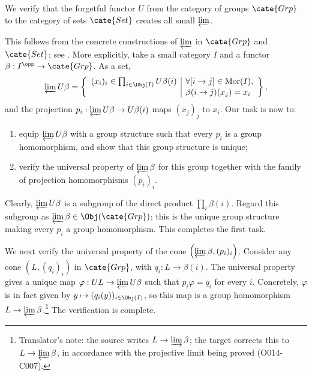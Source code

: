 \begin{example}\label{eg:Grp-Set-create}
	We verify that the forgetful functor $U$ from the category of groups
	$\cate{Grp}$ to the category of sets $\cate{Set}$ creates all small
	$\varprojlim$.

	This follows from the concrete constructions of $\varprojlim$ in
	$\cate{Grp}$ and $\cate{Set}$; see
	\cite[Examples 2.7.5 and 2.8.7]{Li1}. More explicitly, take a small category
	$I$ and a functor $\beta: I^{\opp} \to \cate{Grp}$. As a set,
	\[ \varprojlim U\beta = \left\{\begin{array}{r|l}
		(x_i)_i \in \prod_{i \in \Obj(I)} U\beta(i) & \forall [i \to j] \in \mathrm{Mor}(I), \\
		& \beta(i \to j)(x_j) = x_i
	\end{array}\right\}, \]
	and the projection $p_i: \varprojlim U\beta \to U\beta(i)$ maps $(x_j)_j$
	to $x_i$. Our task is now to:
	\begin{enumerate}
		\item equip $\varprojlim U\beta$ with a group structure such that every
		$p_i$ is a group homomorphism, and show that this group structure is
		unique;
		\item verify the universal property of $\varprojlim \beta$ for this group
		together with the family of projection homomorphisms $(p_i)_i$.
	\end{enumerate}

	Clearly, $\varprojlim U\beta$ is a subgroup of the direct product
	$\prod_i \beta(i)$. Regard this subgroup as
	$\varprojlim \beta \in \Obj(\cate{Grp})$; this is the unique group structure
	making every $p_i$ a group homomorphism. This completes the first task.

	We next verify the universal property of the cone
	$\left( \varprojlim \beta, (p_i)_i\right)$. Consider any cone
	$(L, (q_i)_i)$ in $\cate{Grp}$, with $q_i: L \to \beta(i)$. The universal
	property gives a unique map $\varphi: UL \to \varprojlim U\beta$ such that
	$p_i \varphi = q_i$ for every $i$. Concretely, $\varphi$ is in fact given by
	$y \mapsto (q_i(y))_{i \in \Obj(I)}$, so this map is a group homomorphism
	$L \to \varprojlim \beta$.\footnote{Translator's note: the source writes
	$L \to \varinjlim \beta$; the target corrects this to
	$L \to \varprojlim \beta$, in accordance with the projective limit being
	proved (O014-C007).} The verification is complete.
\end{example}

